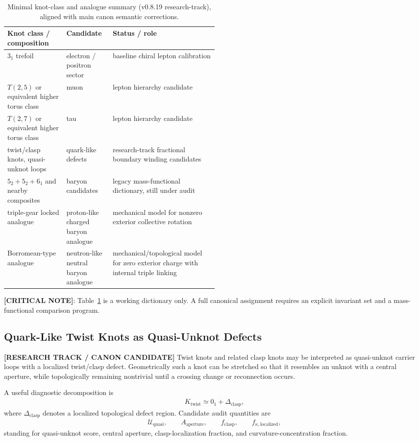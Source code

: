 \begin{table}[h]
\centering
\begin{tabularx}{\linewidth}{p{0.28\linewidth}p{0.22\linewidth}X}
\hline
Knot class / composition & Candidate & Status / role \\
\hline
$3_1$ trefoil & electron / positron sector & baseline chiral lepton calibration \\
$T(2,5)$ or equivalent higher torus class & muon & lepton hierarchy candidate \\
$T(2,7)$ or equivalent higher torus class & tau & lepton hierarchy candidate \\
twist/clasp knots, quasi-unknot loops & quark-like defects & research-track fractional boundary winding candidates \\
$5_2+5_2+6_1$ and nearby composites & baryon candidates & legacy mass-functional dictionary, still under audit \\
triple-gear locked analogue & proton-like charged baryon analogue & mechanical model for nonzero exterior collective rotation \\
Borromean-type analogue & neutron-like neutral baryon analogue & mechanical/topological model for zero exterior charge with internal triple linking \\
\hline
\end{tabularx}
\caption{Minimal knot-class and analogue summary (v0.8.19 research-track), aligned with main canon semantic corrections.}
\label{tab:particle-candidates}
\end{table}

\textbf{[CRITICAL NOTE]}: Table~\ref{tab:particle-candidates} is a working dictionary only. A full canonical assignment requires an explicit invariant set and a mass-functional comparison program.


\subsection{Quark-Like Twist Knots as Quasi-Unknot Defects}
\label{subsec:rt_quark_twist_quasi_unknot}

\textbf{[RESEARCH TRACK / CANON CANDIDATE]} Twist knots and related clasp knots may be interpreted as quasi-unknot carrier loops with a localized twist/clasp defect. Geometrically such a knot can be stretched so that it resembles an unknot with a central aperture, while topologically remaining nontrivial until a crossing change or reconnection occurs.

A useful diagnostic decomposition is
\begin{align}
    K_{\mathrm{twist}}
    \simeq
    0_1 + \Delta_{\mathrm{clasp}},
\end{align}
where $\Delta_{\mathrm{clasp}}$ denotes a localized topological defect region. Candidate audit quantities are
\begin{align}
    \mathcal{U}_{\mathrm{quasi}},\qquad
    A_{\mathrm{aperture}},\qquad
    f_{\mathrm{clasp}},\qquad
    f_{\kappa,\mathrm{localized}},
\end{align}
standing for quasi-unknot score, central aperture, clasp-localization fraction, and curvature-concentration fraction.

